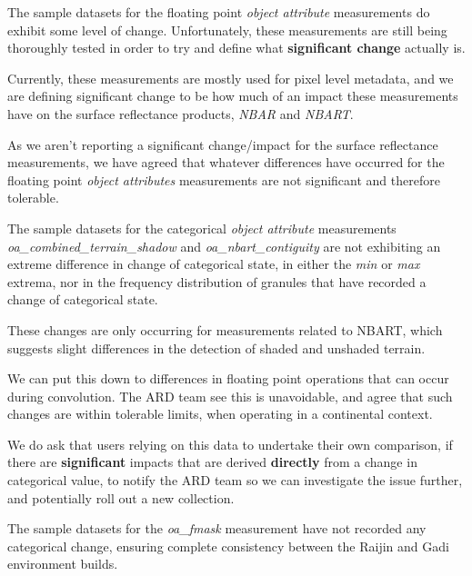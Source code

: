 \documentclass[a4paper]{article}
\begin{document}
    \begin{flushleft}
      The sample datasets for the floating point \textit{object attribute} measurements do exhibit some level of change. Unfortunately, these measurements are still being thoroughly tested in order to try and define what \textbf{significant change} actually is. \par
      Currently, these measurements are mostly used for pixel level metadata, and we are defining significant change to be how much of an impact these measurements have on the surface reflectance products, \textit{NBAR} and \textit{NBART}. \par
      As we aren't reporting a significant change/impact for the surface reflectance measurements, we have agreed that whatever differences have occurred for the floating point \textit{object attributes} measurements are not significant and therefore tolerable. \par
      The sample datasets for the categorical \textit{object attribute} measurements \textit{oa\_combined\_terrain\_shadow} and \textit{oa\_nbart\_contiguity} are not exhibiting an extreme difference in change of categorical state, in either the \textit{min} or \textit{max} extrema, nor in the frequency distribution of granules that have recorded a change of categorical state. \par
      These changes are only occurring for measurements related to NBART, which suggests slight differences in the detection of shaded and unshaded terrain. \par
      We can put this down to differences in floating point operations that can occur during convolution. The ARD team see this is unavoidable, and agree that such changes are within tolerable limits, when operating in a continental context. \par
    \end{flushleft}

    \begin{flushleft}
      We do ask that users relying on this data to undertake their own comparison, if there are \textbf{significant} impacts that are derived \textbf{directly} from a change in categorical value, to notify the ARD team so we can investigate the issue further, and potentially roll out a new collection.\par
      The sample datasets for the \textit{oa\_fmask} measurement have not recorded any categorical change, ensuring complete consistency between the Raijin and Gadi environment builds.
    \end{flushleft}
\end{document}
